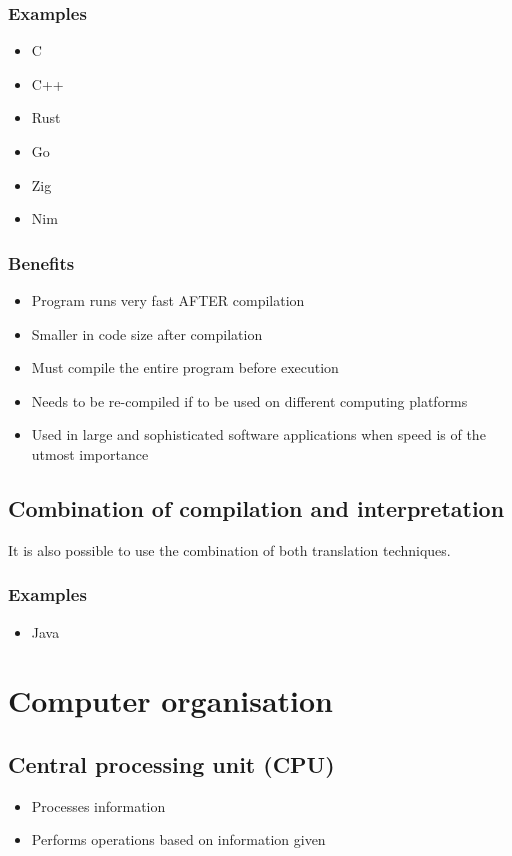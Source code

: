 \documentclass[11pt]{article}
\begin{document}
\subsubsection{Examples}
\label{sec:orgfa0f65b}
\begin{itemize}
\item C
\item C++
\item Rust
\item Go
\item Zig
\item Nim
\end{itemize}

\subsubsection{Benefits}
\label{sec:orgb4cf242}
\begin{itemize}
\item Program runs very fast AFTER compilation
\item Smaller in code size after compilation
\item Must compile the entire program before execution
\item Needs to be re-compiled if to be used on different computing platforms
\item Used in large and sophisticated software applications when speed is of the utmost importance
\end{itemize}

\subsection{Combination of compilation and interpretation}
\label{sec:orgf431f12}
It is also possible to use the combination of both translation techniques.

\subsubsection{Examples}
\label{sec:orge67f31f}
\begin{itemize}
\item Java
\end{itemize}


\section{Computer organisation}
\label{sec:orgdcfb395}

\subsection{Central processing unit (CPU)}
\label{sec:orgaa47c1d}
\begin{itemize}
\item Processes information
\item Performs operations based on information given
\end{itemize}
\end{document}
